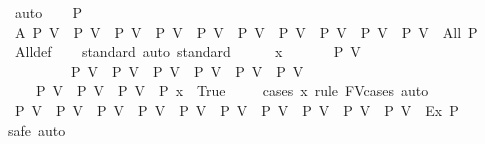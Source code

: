 \begin{isabellebody}
\ auto\isanewline
\ \ \isamarkupfalse%
\ P\ \isanewline
\ \ \isamarkupfalse%
\ A{\isacharcolon}{\kern0pt}\ {\isachardoublequoteopen}{\isacharparenleft}{\kern0pt}P\ V{}\ {\isasymand}\ P\ V{}\ {\isasymand}\ P\ V{}\ {\isasymand}\ P\ V{}\ {\isasymand}\ P\ V{}\ {\isasymand}\ P\ V{}\ {\isasymand}\ P\ V{}\ {\isasymand}\ P\ V{}\ {\isasymand}\ P\ V{}\ {\isasymand}\ P\ V{}{}{\isacharparenright}{\kern0pt}\ {\isacharequal}{\kern0pt}\ All\ P{\isachardoublequoteclose}\isanewline
\ \ \ \ \isamarkupfalse%
\ All{\isacharunderscore}{\kern0pt}def\ \isanewline
\ \ \isamarkupfalse%
{\isacharparenleft}{\kern0pt}standard{\isacharcomma}{\kern0pt}\ auto{\isacharcomma}{\kern0pt}\ standard{\isacharparenright}{\kern0pt}\isanewline
\ \ \ \ \isamarkupfalse%
\ x\ \isanewline
\ \ \ \ \isamarkupfalse%
\ {\isachardoublequoteopen}P\ V{}\ {\isasymLongrightarrow}\isanewline
\ \ \ \ \ \ \ \ \ P\ V{}\ {\isasymLongrightarrow}\ P\ V{}\ {\isasymLongrightarrow}\ P\ V{}\ {\isasymLongrightarrow}\ P\ V{}\ {\isasymLongrightarrow}\ P\ V{}\ {\isasymLongrightarrow}\ P\ V{}\ {\isasymLongrightarrow}\ \isanewline
\ \ \ \ P\ V{}\ {\isasymLongrightarrow}\ P\ V{}\ {\isasymLongrightarrow}\ P\ V{}{}\ {\isasymLongrightarrow}\ P\ x\ {\isacharequal}{\kern0pt}\ True{\isachardoublequoteclose}\isanewline
\ \ \ \ \isamarkupfalse%
{\isacharparenleft}{\kern0pt}cases\ x\ rule{\isacharcolon}{\kern0pt}\ FV{\isacharunderscore}{\kern0pt}cases{\isacharcomma}{\kern0pt}\ auto{\isacharparenright}{\kern0pt}\ \isamarkupfalse%
\isanewline
\ \ \isamarkupfalse%
\isanewline
\ \ \isamarkupfalse%
\ {\isachardoublequoteopen}{\isacharparenleft}{\kern0pt}P\ V{}\ {\isasymor}\ P\ V{}\ {\isasymor}\ P\ V{}\ {\isasymor}\ P\ V{}\ {\isasymor}\ P\ V{}\ {\isasymor}\ P\ V{}\ {\isasymor}\ P\ V{}\ {\isasymor}\ P\ V{}\ {\isasymor}\ P\ V{}\ {\isasymor}\ P\ V{}{}{\isacharparenright}{\kern0pt}\ {\isacharequal}{\kern0pt}\ Ex\ P{\isachardoublequoteclose}\isanewline
\ \ \isamarkupfalse%
{\isacharparenleft}{\kern0pt}safe{\isacharcomma}{\kern0pt}\ auto{\isacharparenright}{\kern0pt}\isanewline

\end{isabellebody}
